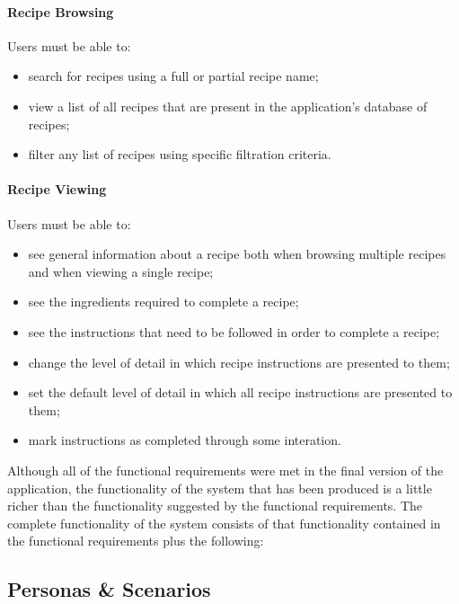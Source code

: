 \paragraph{Recipe Browsing}
Users must be able to:
\begin{itemize}
\item search for recipes using a full or partial recipe name;
\item view a list of all recipes that are present in the application's database of recipes;
\item filter any list of recipes using specific filtration criteria.
\end{itemize}

\paragraph{Recipe Viewing}
Users must be able to:
\begin{itemize}
\item see general information about a recipe both when browsing multiple recipes and when viewing a single recipe;
\item see the ingredients required to complete a recipe;
\item see the instructions that need to be followed in order to complete a recipe;
\item change the level of detail in which recipe instructions are presented to them;
\item set the default level of detail in which all recipe instructions are presented to them;
\item mark instructions as completed through some interation.
\end{itemize}

Although all of the functional requirements were met in the final version of the application, the functionality of the system that has been produced is a little richer than the functionality suggested by the functional requirements. The complete functionality of the system consists of that functionality contained in the functional requirements plus the following: 


\subsection{Personas \& Scenarios}


